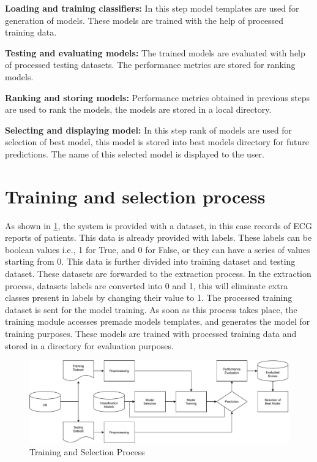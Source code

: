 \vspace{-0.5em}
\textbf{Loading and training classifiers:} In this step model templates are used for generation of models. These models are trained with the help of processed training data.

\vspace{-0.5em}
\textbf{Testing and evaluating models:} The trained models are evaluated with help of processed testing datasets. The performance metrics are stored for ranking models.

\vspace{-0.5em}
\textbf{Ranking and storing models:} Performance metrics obtained in previous steps are used to rank the models, the models are stored in a local directory.

\vspace{-0.5em}
\textbf{Selecting and displaying model:} In this step rank of models are used for selection of best model, this model is stored into best models directory for future predictions. The name of this selected model is displayed to the user.

\section{Training and selection process} \label{sec:data_flow}

As shown in \cref{fig:training_and_selection_process}, the system is provided with a dataset, in this case records of ECG reports of patients. This data is already provided with labels. These labels can be boolean values i.e., 1 for True, and 0 for False, or they can have a series of values starting from 0. This data is further divided into training dataset and testing dataset. These datasets are forwarded to the extraction process. In the extraction process, datasets labels are converted into 0 and 1, this will eliminate extra classes present in labels by changing their value to 1. The processed training dataset is sent for the model training. As soon as this process takes place, the training module accesses premade models templates, and generates the model for training purposes. These models are trained with processed training data and stored in a directory for evaluation purposes.

\begin{figure}[H]
  \centering
  \includegraphics[width=0.9\columnwidth]{media/architecture/Process.pdf}
  \caption{Training and Selection Process}
  \label{fig:training_and_selection_process}
\end{figure}

